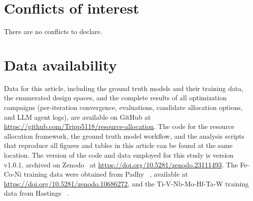 \section*{Conflicts of interest}
There are no conflicts to declare.

\section*{Data availability}
Data for this article, including the ground truth models and their training data, the enumerated design spaces, and the complete results of all optimization campaigns (per-iteration convergence, evaluations, candidate allocation options, and LLM agent logs), are available on GitHub at \url{https://github.com/Tripp5118/resource-allocation}. The code for the resource allocation framework, the ground truth model workflow, and the analysis scripts that reproduce all figures and tables in this article can be found at the same location. The version of the code and data employed for this study is version v1.0.1, archived on Zenodo~\cite{robinson2026agentic} at \url{https://doi.org/10.5281/zenodo.23111493}. The Fe-Co-Ni training data were obtained from Padhy \etal~\cite{padhy2024experimentally, padhy2024data}, available at \url{https://doi.org/10.5281/zenodo.10686272}, and the Ti-V-Nb-Mo-Hf-Ta-W training data from Hastings \etal~\cite{hastings2025leveraging}.
